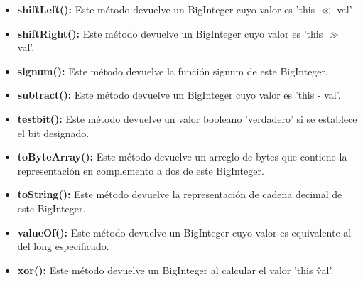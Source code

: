 \begin{itemize}
\item \textbf{shiftLeft():} Este método devuelve un BigInteger cuyo valor es 'this $\ll$ val'.
\item \textbf{shiftRight():} Este método devuelve un BigInteger cuyo valor es 'this $\gg$ val'.
\item \textbf{signum():} Este método devuelve la función signum de este BigInteger.
\item \textbf{subtract():} Este método devuelve un BigInteger cuyo valor es 'this - val'.
\item \textbf{testbit():} Este método devuelve un valor booleano 'verdadero' si se establece el bit designado.
\item \textbf{toByteArray():} Este método devuelve un arreglo de bytes que contiene la representación en complemento a dos de este BigInteger.
\item \textbf{toString():} Este método devuelve la representación de cadena decimal de este BigInteger.
\item \textbf{valueOf():} Este método devuelve un BigInteger cuyo valor es equivalente al del long especificado.
\item \textbf{xor():} Este método devuelve un BigInteger al calcular el valor 'this \^ val'.
\end{itemize}

